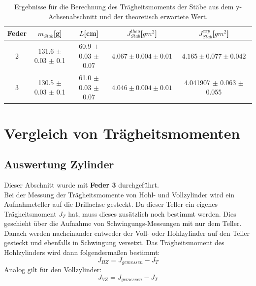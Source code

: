 \documentclass[12pt,a4paper]{article}
\begin{document}
\begin{table}
\caption{Ergebnisse für die Berechnung des Trägheitsmoments der Stäbe aus dem y-Achsenabschnitt und der theoretisch erwartete Wert.}
\label{tab:TrägTheoExp}
\begin{center}
\begin{tabular}{|c|c|c|c|c|}
\hline
Feder & $m_{Stab}$[g] & $L$[cm] & $J_{Stab}^{theo}$[$g m^2$] & $J_{Stab}^{exp}$[$g m^2$]\\
\hline
2 & 131.6 $\pm$ 0.03 $\pm$ 0.1 & 60.9 $\pm$ 0.03 $\pm$ 0.07 & $4.067 \pm 0.004 \pm 0.01 $ & $ 4.165 \pm 0.077 \pm 0.042 $ \\
\hline
3 & 130.5 $\pm$ 0.03 $\pm$ 0.1 & 61.0 $\pm$ 0.03 $\pm$ 0.07 & $4.046 \pm 0.004 \pm  0.01 $ & 4.041907 $\pm$ 0.063 $\pm$ 0.055 \\
\hline
\end{tabular}
\end{center}
\end{table}





\newpage

\section{Vergleich von Trägheitsmomenten}

\subsection{Auswertung Zylinder}
Dieser Abschnitt wurde mit \textbf{Feder 3} durchgeführt.\\
Bei der Messung der Trägheitsmomente von Hohl- und Vollzylinder wird ein Aufnahmeteller auf die Drillachse gesteckt. Da dieser Teller ein eigenes Trägheitsmoment $J_T$ hat, muss dieses zusätzlich noch bestimmt werden. Dies geschieht über die Aufnahme von Schwingungs-Messungen mit nur dem Teller. Danach werden nacheinander entweder der Voll- oder Hohlzylinder auf den Teller gesteckt und ebenfalls in Schwingung versetzt. Das Trägheitsmoment des Hohlzylinders wird dann folgendermaßen bestimmt:
\begin{equation}
J_{HZ} = J_{gemessen}-J_T
\end{equation}
Analog gilt für den Vollzylinder:
\begin{equation}
J_{VZ} = J_{gemessen}-J_T
\end{equation}
\end{document}
